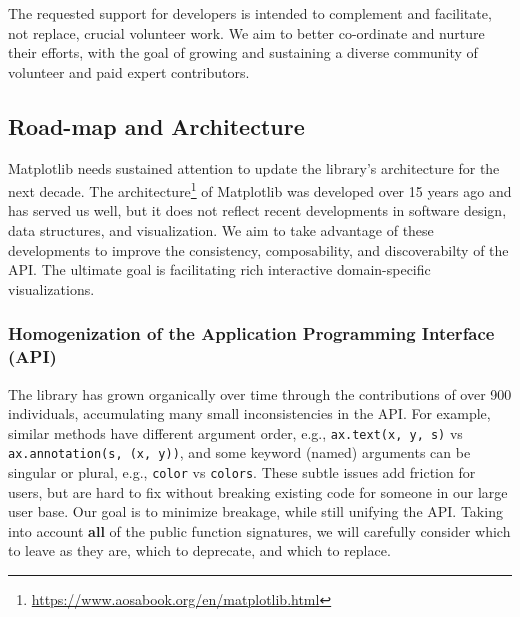 \documentclass[11pt,letterpaper]{article}  %
\begin{document}
The requested support for developers is intended to complement and facilitate, not replace, crucial volunteer work. We aim to better co-ordinate and nurture their efforts, with the goal of growing and sustaining a diverse community of volunteer and paid expert contributors. 





\subsection{Road-map and Architecture}
Matplotlib needs sustained attention to update the library's architecture for the next decade.
The architecture\footnote{\url{https://www.aosabook.org/en/matplotlib.html}} of Matplotlib was developed over 15 years ago \cite{Hunter:2007} and has served us well, but it does not reflect recent developments in software design, data structures, and visualization. We aim to take advantage of these developments to improve the consistency, composability, and discoverabilty of the API. The ultimate goal is facilitating rich interactive domain-specific visualizations.



\subsubsection{Homogenization of the Application Programming Interface (API)}
\label{sec:api_hom}
The library has grown organically over time through the contributions of over 900 individuals, accumulating many small inconsistencies in the API. For example, similar methods have different
argument order, e.g., \texttt{ax.text(x, y, s)} vs
\texttt{ax.annotation(s, (x, y))}, and some keyword (named) arguments can be
singular or plural, e.g., \texttt{color} vs \texttt{colors}.  These
subtle issues add friction for users, but are hard to fix without
breaking existing code for someone in our large user base.  Our goal is
to minimize breakage, while still unifying the API. Taking into account
\textbf{all} of the public function signatures, we will carefully consider which to leave as
they are, which to deprecate, and which to replace.
\end{document}

